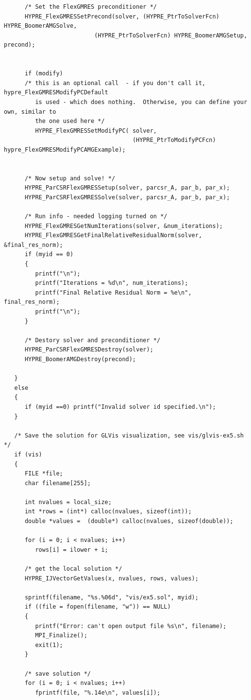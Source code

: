 \documentclass[a4paper,10pt]{article}
\begin{document}
\begin{lstlisting}
      /* Set the FlexGMRES preconditioner */
      HYPRE_FlexGMRESSetPrecond(solver, (HYPRE_PtrToSolverFcn) HYPRE_BoomerAMGSolve,
                          (HYPRE_PtrToSolverFcn) HYPRE_BoomerAMGSetup, precond);


      if (modify)
      /* this is an optional call  - if you don't call it, hypre_FlexGMRESModifyPCDefault
         is used - which does nothing.  Otherwise, you can define your own, similar to
         the one used here */
         HYPRE_FlexGMRESSetModifyPC( solver,
                                     (HYPRE_PtrToModifyPCFcn) hypre_FlexGMRESModifyPCAMGExample);


      /* Now setup and solve! */
      HYPRE_ParCSRFlexGMRESSetup(solver, parcsr_A, par_b, par_x);
      HYPRE_ParCSRFlexGMRESSolve(solver, parcsr_A, par_b, par_x);

      /* Run info - needed logging turned on */
      HYPRE_FlexGMRESGetNumIterations(solver, &num_iterations);
      HYPRE_FlexGMRESGetFinalRelativeResidualNorm(solver, &final_res_norm);
      if (myid == 0)
      {
         printf("\n");
         printf("Iterations = %d\n", num_iterations);
         printf("Final Relative Residual Norm = %e\n", final_res_norm);
         printf("\n");
      }

      /* Destory solver and preconditioner */
      HYPRE_ParCSRFlexGMRESDestroy(solver);
      HYPRE_BoomerAMGDestroy(precond);

   }
   else
   {
      if (myid ==0) printf("Invalid solver id specified.\n");
   }

   /* Save the solution for GLVis visualization, see vis/glvis-ex5.sh */
   if (vis)
   {
      FILE *file;
      char filename[255];

      int nvalues = local_size;
      int *rows = (int*) calloc(nvalues, sizeof(int));
      double *values =  (double*) calloc(nvalues, sizeof(double));

      for (i = 0; i < nvalues; i++)
         rows[i] = ilower + i;

      /* get the local solution */
      HYPRE_IJVectorGetValues(x, nvalues, rows, values);

      sprintf(filename, "%s.%06d", "vis/ex5.sol", myid);
      if ((file = fopen(filename, "w")) == NULL)
      {
         printf("Error: can't open output file %s\n", filename);
         MPI_Finalize();
         exit(1);
      }

      /* save solution */
      for (i = 0; i < nvalues; i++)
         fprintf(file, "%.14e\n", values[i]);


\end{lstlisting}
\end{document}
